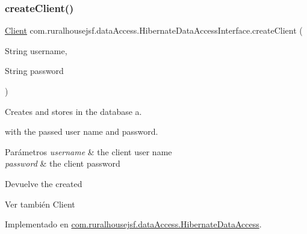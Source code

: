 \subsubsection{\texorpdfstring{createClient()}{createClient()}}
{\footnotesize\ttfamily \mbox{\hyperlink{classcom_1_1ruralhousejsf_1_1domain_1_1_client}{Client}} com.\+ruralhousejsf.\+data\+Access.\+Hibernate\+Data\+Access\+Interface.\+create\+Client (\begin{DoxyParamCaption}\item[{String}]{username,  }\item[{String}]{password }\end{DoxyParamCaption})}



Creates and stores in the database a. 


\begin{DoxyCode}{0}
\end{DoxyCode}
 with the passed user name and password.


\begin{DoxyParams}{Parámetros}
{\em username} & the client user name \\
\hline
{\em password} & the client password\\
\hline
\end{DoxyParams}
\begin{DoxyReturn}{Devuelve}
the created
\begin{DoxyCode}{0}
\end{DoxyCode}

\end{DoxyReturn}
\begin{DoxySeeAlso}{Ver también}
Client 
\end{DoxySeeAlso}


Implementado en \mbox{\hyperlink{classcom_1_1ruralhousejsf_1_1data_access_1_1_hibernate_data_access_ab1113c4a35f6f888d6bee15f25b117d5}{com.\+ruralhousejsf.\+data\+Access.\+Hibernate\+Data\+Access}}.

\mbox{\label{interfacecom_1_1ruralhousejsf_1_1data_access_1_1_hibernate_data_access_interface_a0fe06262f78319a1fd4c2fd4e9534db8}} 
